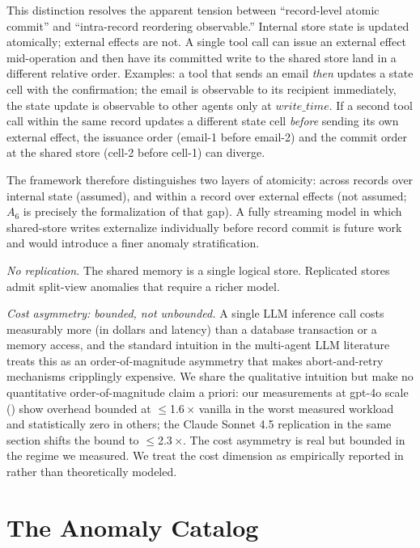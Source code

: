 \documentclass[journal,compsoc,10pt]{IEEEtran}
\theoremstyle{definition}
\theoremstyle{remark}
\newcommand{\fld}[1]{\mathit{#1}}
\begin{document}
This distinction resolves the apparent tension between
``record-level atomic commit'' and ``intra-record reordering
observable.'' Internal store state is updated atomically; external
effects are not. A single tool call can issue an external effect
mid-operation and then have its committed write to the shared
store land in a different relative order. Examples: a tool that
sends an email \emph{then} updates a state cell with the
confirmation; the email is observable to its recipient
immediately, the state update is observable to other agents only
at $\fld{write\_time}$. If a second tool call within the same
record updates a different state cell \emph{before} sending its
own external effect, the issuance order (email-1 before email-2)
and the commit order at the shared store (cell-2 before cell-1)
can diverge.

The framework therefore distinguishes two layers of atomicity:
across records over internal state (assumed), and within a record
over external effects (not assumed; $A_6$ is precisely the
formalization of that gap). A fully streaming model in which
shared-store writes externalize individually before record commit
is future work and would introduce a finer anomaly
stratification.

\emph{No replication.}
The shared memory is a single logical store. Replicated stores admit
split-view anomalies that require a richer model.

\emph{Cost asymmetry: bounded, not unbounded.}
A single LLM inference call costs measurably more (in
dollars and latency) than a database transaction or a memory access,
and the standard intuition in the multi-agent LLM literature
treats this as an order-of-magnitude asymmetry that makes
abort-and-retry mechanisms cripplingly expensive. We
share the qualitative intuition but make no quantitative
order-of-magnitude claim a priori: our measurements at gpt-4o
scale () show overhead bounded at
$\leq$1.6\,$\times$ vanilla in the worst measured workload and
statistically zero in others; the Claude Sonnet 4.5 replication
in the same section shifts the bound to $\leq$2.3\,$\times$.
The cost asymmetry is real but bounded in the regime we measured.
We treat the cost dimension as empirically reported in
 rather than theoretically modeled.

\section{The Anomaly Catalog}
\label{sec:anomalies}
\end{document}
